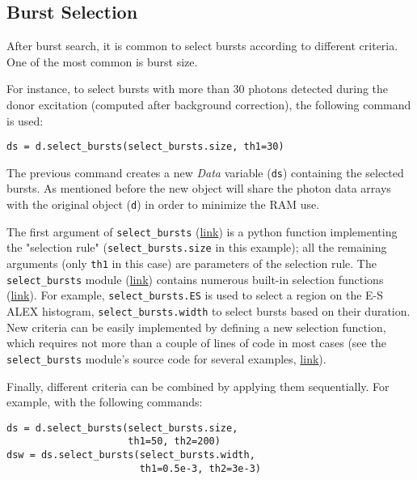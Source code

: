 \subsection{Burst Selection}
\label{sec:burstsel}

After burst search, it is common to select bursts according to different
criteria. One of the most common is burst size.

For instance, to select bursts with more than 30 photons detected during the donor excitation (computed
after background correction), the following command is used:

\begin{lstlisting}
ds = d.select_bursts(select_bursts.size, th1=30)
\end{lstlisting}

The previous command creates a new \textit{Data} variable (\verb|ds|) containing
the selected bursts.
As mentioned before the new object will share the photon data
arrays with the original object (\verb|d|) in order to minimize the RAM use.

The first argument of \verb|select_bursts|
(\href{http://fretbursts.readthedocs.org/en/latest/data_class.html#burst-selection-methods}{link})
is a python function implementing the "selection rule" (\verb|select_bursts.size| in this example);
all the remaining arguments (only \verb|th1| in this case) are parameters of the selection rule.
The \verb|select_bursts| module
(\href{http://fretbursts.readthedocs.org/en/latest/burst_selection.html}{link})
contains numerous built-in selection functions
(\href{http://fretbursts.readthedocs.org/en/latest/burst_selection.html#module-fretbursts.select_bursts}{link}).
For example,
\verb|select_bursts.ES|
is used to select a region on the E-S ALEX histogram,
\verb|select_bursts.width|
to select bursts based on their duration.
New criteria can be easily implemented by defining a new selection function,
which requires not more than a couple of lines of code in most cases (see the
\verb|select_bursts| module's source code
for several examples,
\href{https://github.com/tritemio/FRETBursts/blob/master/fretbursts/select_bursts.py}{link}).

Finally, different criteria can be combined by applying them sequentially.
For example, with the following commands:

\begin{lstlisting}
ds = d.select_bursts(select_bursts.size,
                     th1=50, th2=200)
dsw = ds.select_bursts(select_bursts.width,
                       th1=0.5e-3, th2=3e-3)
\end{lstlisting}

